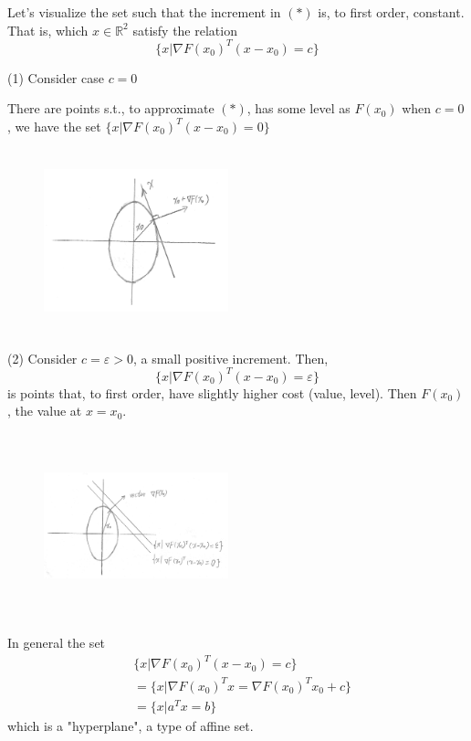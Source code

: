 Let's visualize the set such that the increment in $(*)$ is, to first order, constant. That is, which $x \in \mathbb{R}^2$ satisfy the relation
$$\{x | \nabla F(x_0)^{T} (x-x_0) = c\}$$


(1) Consider case $c=0$

There are points s.t., to approximate $(*)$, has some level as $F(x_0)$ when $c=0$, we have the set $\{x | \nabla F(x_0)^{T} (x-x_0) = 0\}$

\begin{figure}
	\centering
	\includegraphics[width=2.1in,height=2.1in]{figures/ch02/p60-2.jpg}
\end{figure}


(2) Consider $c = \varepsilon > 0$, a small positive increment. Then, 
$$\{x | \nabla F(x_0)^{T} (x-x_0) = \varepsilon\}$$
is points that, to first order, have slightly higher cost (value, level). Then $F(x_0)$, the value at $x=x_0$.

\begin{figure}
	\centering
	\includegraphics[width=2.1in,height=2.1in]{figures/ch02/p61.jpg}
\end{figure}

In general the set
\begin{align*}
&\{x | \nabla F(x_0)^{T} (x-x_0) = c\}\\
&= \{x | \nabla F(x_0)^{T} x = \nabla F(x_0)^{T} x_0 + c\} \\
&= \{x | a^{T}x = b\}
\end{align*}
which is a "hyperplane", a type of affine set. 

